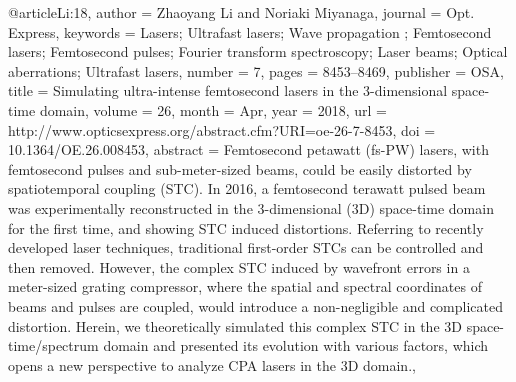 @article{Li:18,
author = {Zhaoyang Li and Noriaki Miyanaga},
journal = {Opt. Express},
keywords = {Lasers; Ultrafast lasers; Wave propagation ; Femtosecond lasers; Femtosecond pulses; Fourier transform spectroscopy; Laser beams; Optical aberrations; Ultrafast lasers},
number = {7},
pages = {8453--8469},
publisher = {OSA},
title = {Simulating ultra-intense femtosecond lasers in the 3-dimensional space-time domain},
volume = {26},
month = {Apr},
year = {2018},
url = {http://www.opticsexpress.org/abstract.cfm?URI=oe-26-7-8453},
doi = {10.1364/OE.26.008453},
abstract = {Femtosecond petawatt (fs-PW) lasers, with femtosecond pulses and sub-meter-sized beams, could be easily distorted by spatiotemporal coupling (STC). In 2016, a femtosecond terawatt pulsed beam was experimentally reconstructed in the 3-dimensional (3D) space-time domain for the first time, and showing STC induced distortions. Referring to recently developed laser techniques, traditional first-order STCs can be controlled and then removed. However, the complex STC induced by wavefront errors in a meter-sized grating compressor, where the spatial and spectral coordinates of beams and pulses are coupled, would introduce a non-negligible and complicated distortion. Herein, we theoretically simulated this complex STC in the 3D space-time/spectrum domain and presented its evolution with various factors, which opens a new perspective to analyze CPA lasers in the 3D domain.},
}

